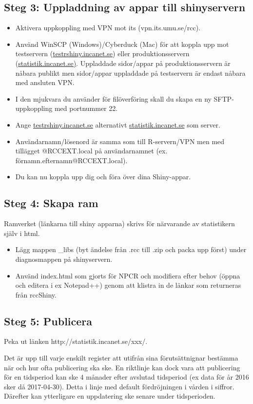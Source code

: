 \documentclass[12pt, a4paper,twoside]{report}
\begin{document}
\subsection{Steg 3: Uppladdning av appar till shinyservern}
\begin{itemize}
\item Aktivera uppkoppling med VPN mot its (vpn.its.umu.se/rcc).
\item Använd WinSCP (Windows)/Cyberduck (Mac) för att koppla upp mot testservern (\url{testrshiny.incanet.se}) eller produktionsservern (\url{statistik.incanet.se)}. Uppladdade sidor/appar på produktionsservern är nåbara publikt men sidor/appar uppladdade på testservern är endast nåbara med ansluten VPN.
\item I den mjukvara du använder för filöverföring skall du skapa en ny SFTP-uppkoppling med portnummer 22.
\item Ange \url{testrshiny.incanet.se} alternativt \url{statistik.incanet.se} som server.
\item Användarnamn/lösenord är samma som till R-servern/VPN men med tillägget @RCCEXT.local på användarnamnet (ex. förnamn.efternamn@RCCEXT.local).
\item Du kan nu koppla upp dig och föra över dina Shiny-appar.
\end{itemize}
\subsection{Steg 4: Skapa ram}
Ramverket (länkarna till shiny apparna) skrivs för närvarande av statistikern själv i html. 
\begin{itemize}
\item Lägg mappen \_libs (byt ändelse från .rcc till .zip och packa upp först) under diagnosmappen på shinyservern. 
\item Använd index.html som gjorts för NPCR och modifiera efter behov (öppna och editera i ex Notepad++) genom att klistra in de länkar som returneras från rccShiny. 
\end{itemize}
\subsection{Steg 5: Publicera}
Peka ut länken http://statistik.incanet.se/xxx/.

Det är upp till varje enskilt register att utifrån sina förutsättnignar bestämma när och hur ofta publicering ska ske. En riktlinje kan dock vara att publicering för en tidsperiod kan ske 4 månader efter avslutad tidsperiod (ex data för år 2016 sker då 2017-04-30). Detta i linje med default fördröjningen i vården i siffror. Därefter kan ytterligare en uppdatering ske senare under tidsperioden.  
\end{document}
